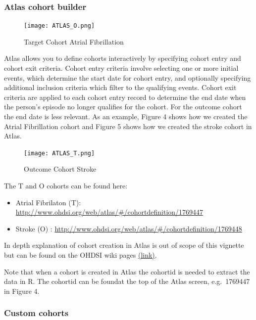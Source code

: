 \documentclass[]{article}
\providecommand{\tightlist}{%
  \setlength{\itemsep}{0pt}\setlength{\parskip}{0pt}}
\begin{document}
\subsubsection{Atlas cohort builder}\label{atlas-cohort-builder}

\begin{figure}
\centering
\texttt{[image: ATLAS\_O.png]}
\caption{Target Cohort Atrial Fibrillation}
\end{figure}

Atlas allows you to define cohorts interactively by specifying cohort
entry and cohort exit criteria. Cohort entry criteria involve selecting
one or more initial events, which determine the start date for cohort
entry, and optionally specifying additional inclusion criteria which
filter to the qualifying events. Cohort exit criteria are applied to
each cohort entry record to determine the end date when the person's
episode no longer qualifies for the cohort. For the outcome cohort the
end date is less relevant. As an example, Figure 4 shows how we created
the Atrial Fibrillation cohort and Figure 5 shows how we created the
stroke cohort in Atlas.

\begin{figure}
\centering
\texttt{[image: ATLAS\_T.png]}
\caption{Outcome Cohort Stroke}
\end{figure}

The T and O cohorts can be found here:

\begin{itemize}
\tightlist
\item
  Atrial Fibrilaton (T):
  \url{http://www.ohdsi.org/web/atlas/\#/cohortdefinition/1769447}
\item
  Stroke (O) :
  \url{http://www.ohdsi.org/web/atlas/\#/cohortdefinition/1769448}
\end{itemize}

In depth explanation of cohort creation in Atlas is out of scope of this
vignette but can be found on the OHDSI wiki pages
\href{http://www.ohdsi.org/web/wiki/doku.php?id=documentation:software:atlas}{(link)}.

Note that when a cohort is created in Atlas the cohortid is needed to
extract the data in R. The cohortid can be foundat the top of the Atlas
screen, e.g.~1769447 in Figure 4.

\subsubsection{Custom cohorts}\label{custom-cohorts}
\end{document}
